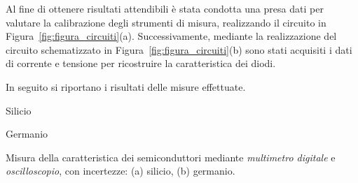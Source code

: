 \documentclass[@MAIN@]{subfiles}
\begin{document}
    Al fine di ottenere risultati attendibili è stata condotta una presa dati per valutare la
    calibrazione degli strumenti di misura, realizzando il circuito in Figura~\ref{fig:figura_circuiti}(a). Successivamente,
    mediante la realizzazione del circuito schematizzato in Figura~\ref{fig:figura_circuiti}(b)
    sono stati acquisiti i dati di corrente e tensione per ricostruire la caratteristica dei diodi.\newline

    \noindent In seguito si riportano i risultati delle misure effettuate.\newline
    \vspace{1.5pt}

    \begin{table}[ht]
        \centering
        \begin{subtable}[t]{.45\textwidth}
            \centering
            
            \captionsetup{justification=centering} %
            \caption{Silicio} %
            \label{tab:silicio}
        \end{subtable}
        \hfill
        \begin{subtable}[t]{.45\textwidth}
            \centering
            
            \captionsetup{justification=centering} %
            \caption{Germanio} %
            \label{tab:germanio}
        \end{subtable}

        \vspace{0.5pt} %

        \caption{Misura della caratteristica dei semiconduttori mediante \textit{multimetro digitale} e
        \textit{oscilloscopio}, con incertezze: (a) silicio, (b) germanio.}
        \label{tab:tabelle_semiconduttori}

    \end{table}
    \\
    \begin{center}
        
    \end{center}
\end{document}

